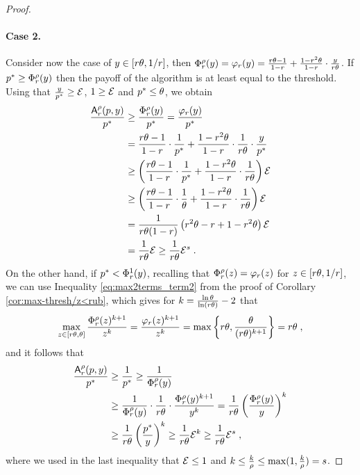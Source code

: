 \begin{proof}
\paragraph{Case 2.} Consider now the case of $y \in [r \theta, 1/r]$, then 
$\Phi^\rho_r(y) = \varphi_r(y) = \frac{r \theta - 1}{1-r} + \frac{1-r^2 \theta}{1-r}\cdot \frac{y}{r \theta}$.
If $p^* \geq \Phi^\rho_r(y)$ then the payoff of the algorithm is at least equal to the threshold. Using that $\frac{y}{p^*} \geq \mathcal{E}$, $1 \geq \mathcal{E}$ and $p^* \leq \theta$, we obtain
\begin{align}
\frac{\mbox{\textup{\textsf{A}}}^\rho_r(p,y)}{p^*}
&\geq \frac{\Phi^\rho_r(y)}{p^*}
= \frac{\varphi_r(y)}{p^*} \nonumber\\
&= \frac{r \theta - 1}{1-r}\cdot \frac{1}{p^*} + \frac{1-r^2 \theta}{1-r}\cdot \frac{1}{r \theta}\cdot \frac{y}{p^*}\nonumber\\
&\geq \left( \frac{r \theta - 1}{1-r}\cdot \frac{1}{p^*} + \frac{1-r^2 \theta}{1-r}\cdot \frac{1}{r \theta} \right) \mathcal{E} \nonumber \\
&\geq \left( \frac{r \theta - 1}{1-r}\cdot \frac{1}{\theta} + \frac{1-r^2 \theta}{1-r}\cdot \frac{1}{r \theta} \right) \mathcal{E} \nonumber\\
&= \frac{1}{r \theta (1-r)}\left(r^2\theta - r + 1 - r^2\theta \right) \mathcal{E} \nonumber\\
&= \frac{1}{r \theta} \mathcal{E}
\geq \frac{1}{r \theta} \mathcal{E}^s\;. \label{aligneq:case-thresh=varphi-p>thresh}
\end{align}
On the other hand, if $p^* < \Phi^1_r(y)$, recalling that $\Phi^\rho_r(z) = \varphi_r(z)$ for $z \in [r \theta, 1/r]$, we can use Inequality \eqref{eq:max2terms_term2} from the proof of Corollary \ref{cor:max-thresh/z<rub}, which gives for $k = \frac{\ln \theta}{\ln (r \theta)}-2$ that 
\[
\max_{z \in [r \theta, \theta]} \frac{\Phi^\rho_r(z)^{k+1}}{z^k} 
= \frac{\varphi_r(z)^{k+1}}{z^k} 
= \max \left\{ r \theta, \frac{\theta}{(r\theta)^{k+1}} \right\}
= r \theta\;,
\]
and it follows that
\begin{align*}
\frac{\mbox{\textup{\textsf{A}}}^\rho_r(p,y)}{p^*}
&\geq \frac{1}{p^*}
\geq \frac{1}{\Phi^\rho_r(y)}\\
&\geq \frac{1}{\Phi^\rho_r(y)} \cdot \frac{1}{r \theta} \cdot \frac{\Phi^\rho_r(y)^{k+1}}{y^k}
= \frac{1}{r \theta} \left( \frac{\Phi^\rho_r(y)}{y} \right)^k\\
&\geq \frac{1}{r \theta} \left( \frac{p^*}{y}\right)^k
\geq \frac{1}{r \theta} \mathcal{E}^k
\geq \frac{1}{r \theta} \mathcal{E}^s\;,
\end{align*}
where we used in the last inequality that $\mathcal{E} \leq 1$ and $k \leq \frac{k}{\rho} \leq \max(1,\frac{k}{\rho}) = s$.


\end{proof}
